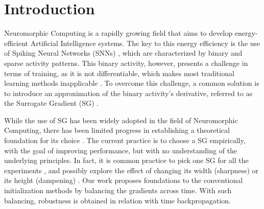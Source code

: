 

\section{Introduction}


Neuromorphic Computing is a rapidly growing field that aims to develop energy-efficient Artificial Intelligence systems. The key to this energy efficiency is the use of Spiking Neural Networks (SNNs) \cite{henderson2020towards,blouw2019benchmarking, 9395703, lapique1907recherches,izhikevich2003simple}, which are characterized by binary and sparse activity patterns. This binary activity, however, presents a challenge in terms of training, as it is not differentiable, which makes most traditional learning methods inapplicable \cite{robbins1951stochastic, kiefer1952stochastic,adam}.
To overcome this challenge, a common solution is to introduce an approximation of the binary activity's derivative, referred to as the Surrogate Gradient (SG) \cite{esser2016convolutional, zenke2018superspike, lsnn}.

While the use of SG has been widely adopted in the field of Neuromorphic Computing, there has been limited progress in establishing a theoretical foundation for its choice \cite{surrogate2019, zenke2021remarkable}. The current practice is to choose a SG empirically, with the goal of improving performance, but with no understanding of the underlying principles.
In fact, it is common practice to pick one SG for all the experiments \cite{spikingbohte,courbariaux2016binarized,lsnn,zenke2018superspike,zenke2021remarkable,yin2021accurate}, and possibly explore the effect of changing its width (sharpness) \cite{zenke2018superspike} or its height (dampening) \cite{lsnn}. Our work proposes foundations to the conventional initialization methods by balancing the gradients across time. With such balancing, robustness is obtained in relation with time backpropagation.

